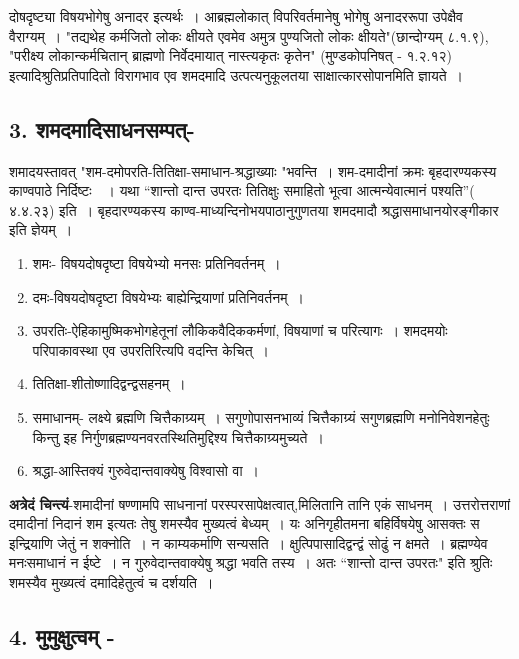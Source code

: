 {दोषदृष्ट्या विषयभोगेषु अनादर इत्यर्थः~। आब्रह्मलोकात् विपरिवर्तमानेषु भोगेषु अनादररूपा उपेक्षैव वैराग्यम्~। "तद्यथेह कर्मजितो लोकः क्षीयते एवमेव अमुत्र पुण्यजितो लोकः क्षीयते"(छान्दोग्यम् ८.१.९), "परीक्ष्य लोकान्कर्मचितान् ब्राह्मणो निर्वेदमायात् नास्त्यकृतः कृतेन" (मुण्डकोपनिषत् - १.२.१२) इत्यादिश्रुतिप्रतिपादितो विरागभाव एव शमदमादि उत्पत्यनुकूलतया साक्षात्कारसोपानमिति ज्ञायते~। 

\subsection*{3. शमदमादिसाधनसम्पत्-}

शमादयस्तावत् "शम-दमोपरति-तितिक्षा-समाधान-श्रद्धाख्याः "भवन्ति~। शम-दमादीनां क्रमः बृहदारण्यकस्य काण्वपाठे निर्दिष्टः~~। यथा “शान्तो दान्त उपरतः तितिक्षुः समाहितो भूत्वा आत्मन्येवात्मानं पश्यति”( ४.४.२३) इति~। बृहदारण्यकस्य काण्व-माध्यन्दिनोभयपाठानुगुणतया शमदमादौ श्रद्धासमाधानयोरङ्गीकार इति ज्ञेयम्~। 

\begin{enumerate}	
\item शमः- विषयदोषदृष्टा 	विषयेभ्यो 	मनसः 	प्रतिनिवर्तनम्~। 
\item दमः-विषयदोषदृष्टा 	विषयेभ्यः 	बाह्येन्द्रियाणां 	प्रतिनिवर्तनम्~। 
\item उपरतिः-ऐहिकामुष्मिकभोगहेतूनां 	लौकिकवैदिककर्मणां, 	विषयाणां 	च   परित्यागः~। शमदमयोः 	परिपाकावस्था 	एव 	उपरतिरित्यपि 	वदन्ति केचित्~। 
\item तितिक्षा-शीतोष्णादिद्वन्द्वसहनम्~। 
\item समाधानम्- लक्ष्ये ब्रह्मणि चित्तैकाग्र्यम्~। सगुणोपासनभाव्यं चित्तैकाग्र्यं 	 सगुणब्रह्मणि मनोनिवेशनहेतुः किन्तु 	इह निर्गुणब्रह्मण्यनवरतस्थितिमुद्दिश्य 	चित्तैकाग्र्यमुच्यते~। 
\item श्रद्धा-आस्तिक्यं गुरुवेदान्तवाक्येषु विश्वासो वा~। 
\end{enumerate}

\textbf{अत्रेदं चिन्त्यं}-शमादीनां षण्णामपि साधनानां परस्परसापेक्षत्वात्,मिलितानि तानि एकं साधनम्~। उत्तरोत्तराणां दमादीनां निदानं शम इत्यतः तेषु शमस्यैव मुख्यत्वं बेध्यम्~। यः अनिगृहीतमना बहिर्विषयेषु आसक्तः स इन्द्रियाणि जेतुं न शक्नोति~। न काम्यकर्माणि सन्यसति~। क्षुत्पिपासादिद्वन्द्वं सोढुं न क्षमते~। ब्रह्मण्येव मनःसमाधानं न ईष्टे~। न गुरुवेदान्तवाक्येषु श्रद्धा भवति तस्य~। अतः “शान्तो दान्त उपरतः" इति श्रुतिः शमस्यैव मुख्यत्वं दमादिहेतुत्वं च दर्शयति~। 

\subsection*{4. मुमुक्षुत्वम् -} 

}
